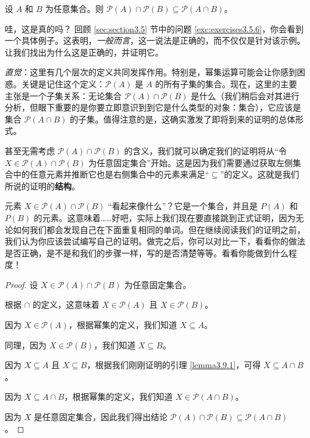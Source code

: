 \begin{proposition}
    设 $A$ 和 $B$ 为任意集合。则 $\mathcal{P}(A) \cap \mathcal{P}(B) \subseteq \mathcal{P}(A \cap B)$。
\end{proposition}

哇，这是真的吗？ 回顾 \ref{sec:section3.5} 节中的问题 \ref{exc:exercises3.5.6}，你会看到一个具体例子。这表明，\emph{一般而言}，这一说法是正确的，而不仅仅是针对该示例。让我们找出为什么这是正确的，并证明它。

\emph{直觉}：这里有几个层次的定义共同发挥作用。特别是，幂集运算可能会让你感到困惑。关键是记住这个定义：$\mathcal{P}(A)$ 是 $A$ 的所有子集的集合。现在，这里的主要主张是一个子集关系：无论集合 $\mathcal{P}(A) \cap \mathcal{P}(B)$ 是什么（我们稍后会对其进行分析，但眼下重要的是你要立即意识到到它是什么类型的对象：集合），它应该是集合 $\mathcal{P}(A \cap B)$ 的子集。值得注意的是，这确实激发了即将到来的证明的总体形式。

甚至无需考虑 $\mathcal{P}(A) \cap \mathcal{P}(B)$ 的含义，我们就可以确定我们的证明将从``令 $X \in \mathcal{P}(A) \cap \mathcal{P}(B)$ 为任意固定集合''开始。这是因为我们需要通过获取左侧集合中的任意元素并推断它也是右侧集合中的元素来满足``$\subseteq$''的定义。这就是我们所说的证明的\textbf{结构}。

元素 $X \in \mathcal{P}(A) \cap \mathcal{P}(B)$ ``看起来像什么''？它是一个集合，并且是 $P(A)$ 和 $P(B)$ 的元素。这意味着……好吧，实际上我们现在要直接跳到正式证明，因为无论如何我们都会发现自己在下面重复相同的单词。但在继续阅读我们的证明之前，我们认为你应该尝试编写自己的证明。做完之后，你可以对比一下，看看你的做法是否正确，是不是和我们的步骤一样，写的是否清楚等等。看看你能做到什么程度！

\begin{proof}
    设 $X \in \mathcal{P}(A) \cap \mathcal{P}(B)$ 为任意固定集合。

    根据 $\cap$ 的定义，这意味着 $X \in \mathcal{P}(A)$ 且 $X \in \mathcal{P}(B)$。

    因为 $X \in \mathcal{P}(A)$，根据幂集的定义，我们知道 $X \subseteq A$。

    同理，因为 $X \in \mathcal{P}(B)$，我们知道 $X \subseteq B$。

    因为 $X \subseteq A$ 且 $X \subseteq B$，根据我们刚刚证明的引理 \ref{lemma3.9.1}，可得 $X \subseteq A \cap B$。

    因为 $X \subseteq A \cap B$，根据幂集的定义，我们知道 $X \in \mathcal{P}(A \cap B)$。

    因为 $X$ 是任意固定集合，因此我们得出结论 $\mathcal{P}(A) \cap \mathcal{P}(B) \subseteq \mathcal{P}(A \cap B)$。
\end{proof}

